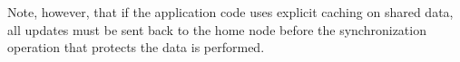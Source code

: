 Note, however, that if the application code uses explicit caching on shared
data, all updates must be sent back to the home node before the
synchronization operation that protects the data is performed.



